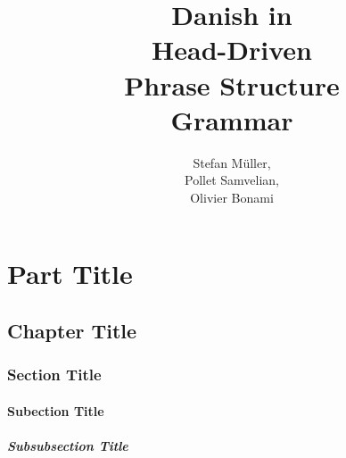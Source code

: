\documentclass[series=eotms,number=45]{langsci}
\title{Danish in \\ Head-Driven \\   Phrase Structure \\ Grammar  }
\author{Stefan Müller, \\ Pollet Samvelian, \\ Olivier Bonami}
\begin{document}
       

\maketitle                

\tableofcontents
  
\part{Part Title}	               
\chapter{Chapter Title}
\section{Section Title}
\subsection{Subection Title}
\subsubsection{Subsubsection Title}        

\lipsum 
\lipsum[3-10]

\newpage

\layout
                              
\end{document}
